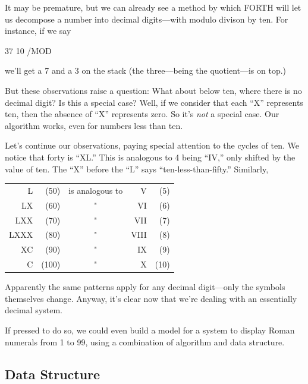 \noindent It may be premature, but we can already see a method by
which FORTH will let us decompose a number into decimal digits---with
modulo divison by ten. For instance, if we say

\begin{Code}
37 10 /MOD
\end{Code}
we'll get a 7 and a 3 on the stack (the three---being the quotient---is on
top.)

But these observations raise a question: What about below ten,
where there is no decimal digit? Is this a special case? Well, if we consider
that each ``X'' represents ten, then the absence of ``X'' represents zero.
So it's \emph{not} a special case. Our algorithm works, even for numbers less
than ten.

Let's continue our observations, paying special attention to the
cycles of ten. We notice that forty is ``XL.'' This is analogous to 4 being
``IV,'' only shifted by the value of ten. The ``X'' before the ``L'' says
``ten-less-than-fifty.'' Similarly,

\bigskip
{\sf\begin{tabular}{rrcrr}
   L &  (50) &   is analogous to &     V & (5) \\
  LX &  (60) &          "        &    VI & (6) \\
 LXX &  (70) &          "        &   VII & (7) \\
LXXX &  (80) &          "        &  VIII & (8) \\
  XC &  (90) &          "        &    IX & (9) \\
   C & (100) &          "        &     X & (10) \\
\end{tabular}}
\bigskip

Apparently the same patterns apply for any decimal digit---only the
symbols themselves change. Anyway, it's clear now that we're dealing with
an essentially decimal system.

If pressed to do so, we could even build a model for a system to display
Roman numerals from 1 to 99, using a combination of algorithm and
data structure.

\subsection{Data Structure}

